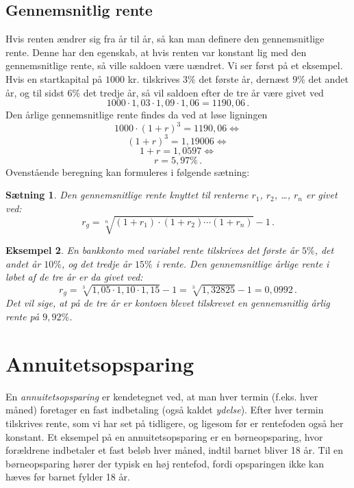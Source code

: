 \documentclass[12pt,oneside,a4paper]{article}
\newtheorem{thm}{Sætning}[section]
\newtheorem{eks}[thm]{Eksempel}
\begin{document}
\subsection*{Gennemsnitlig rente}
Hvis renten ændrer sig fra år til år, så kan man definere den gennemsnitlige
rente. Denne har den egenskab, at hvis renten var konstant lig med den
gennemsnitlige rente, så ville saldoen være uændret.  Vi ser først på et
eksempel. Hvis en startkapital på $1000$ kr. tilskrives $3\%$ det første år,
dernæst $9\%$ det andet år, og til sidst $6\%$ det tredje år, så vil saldoen
efter de tre år være givet ved
\[
    1000\cdot 1,03 \cdot 1,09 \cdot 1,06 = 1190,06\,.
\]
Den årlige gennemsnitlige rente findes da ved at løse ligningen
\[
    1000\cdot (1+r)^3 = 1190,06 \Leftrightarrow 
\]
\[
    (1+r)^3=1,19006 \Leftrightarrow
\]
\[
    1+r = 1,0597 \Leftrightarrow
\]
\[
    r = 5,97\%\,.
\]
Ovenstående beregning kan formuleres i følgende sætning:
\begin{thm}
    Den gennemsnitlige rente knyttet til renterne $r_1$, $r_2$, \ldots, $r_n$
    er givet ved:
    \[
        r_g = \sqrt[n]{(1+r_1)\cdot(1+r_2)\cdots(1+r_n)}-1 \,.
    \]
\end{thm}
\begin{eks}
    En bankkonto med variabel rente tilskrives det første år $5\%$, det andet
    år $10\%$, og det tredje år $15\%$ i rente. Den gennemsnitlige årlige rente
    i løbet af de tre år er da givet ved:
    \[
        r_g = \sqrt[3]{1,05\cdot1,10\cdot1,15}-1 = \sqrt[3]{1,32825}-1 = 0,0992\,.
    \]
Det vil sige, at på de tre år er kontoen blevet tilskrevet en gennemsnitlig
    årlig rente på $9,92\%$.
\end{eks}


\section{Annuitetsopsparing}
En \emph{annuitetsopsparing} er kendetegnet ved, at man hver termin (f.eks. hver
måned) foretager en fast indbetaling (også kaldet \emph{ydelse}). Efter hver
termin tilskrives rente, som vi har set på tidligere, og ligesom før er
rentefoden også her konstant. Et eksempel på en annuitetsopsparing er en
børneopsparing, hvor forældrene indbetaler et fast beløb hver måned, indtil
barnet bliver 18 år. Til en børneopsparing hører der typisk en høj rentefod,
fordi opsparingen ikke kan hæves før barnet fylder 18 år.
\end{document}
